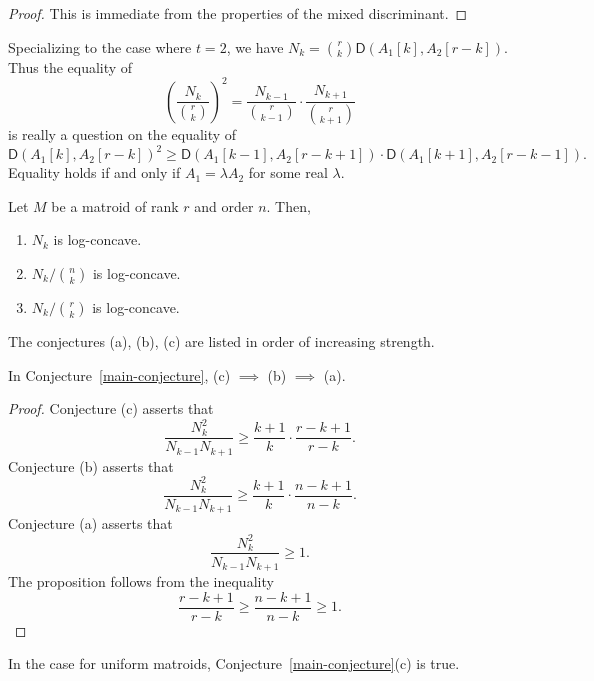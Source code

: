 \documentclass[12pt]{article}
\begin{document}
\begin{proof}
	This is immediate from the properties of the mixed discriminant. 
\end{proof}

Specializing to the case where $t = 2$, we have $N_k = \binom{r}{k} \mathsf{D} (A_1[k], A_2[r-k])$. Thus the equality of 
\[
	\left ( \frac{N_k}{\binom{r}{k}} \right )^2 = \frac{N_{k-1}}{\binom{r}{k-1}} \cdot \frac{N_{k+1}}{\binom{r}{k+1}}
\]
is really a question on the equality of 
\[
	\mathsf{D}(A_1[k], A_2[r-k])^2 \geq \mathsf{D}(A_1[k-1], A_2[r-k+1]) \cdot \mathsf{D}(A_1[k+1], A_2[r-k-1]). 
\]
Equality holds if and only if $A_1 = \lambda A_2$ for some real $\lambda$. 


\begin{conj} \label{main-conjecture}
	Let $M$ be a matroid of rank $r$ and order $n$. Then,  
	\begin{enumerate}[label = (\alph*)]
		\item $N_k$ is log-concave.
		\item $N_k /\binom{n}{k}$ is log-concave.
		\item $N_k / \binom{r}{k}$ is log-concave.
	\end{enumerate}
\end{conj}

The conjectures (a), (b), (c) are listed in order of increasing strength. 

\begin{prop}
	In Conjecture~\ref{main-conjecture}, (c) $\implies$ (b) $\implies$ (a). 
\end{prop}

\begin{proof}
	Conjecture (c) asserts that 
	\[
		\frac{N_k^2}{N_{k-1}N_{k+1}} \geq \frac{k+1}{k} \cdot \frac{r-k+1}{r-k}.
	\]
	Conjecture (b) asserts that
	\[
		\frac{N_k^2}{N_{k-1}N_{k+1}} \geq \frac{k+1}{k} \cdot \frac{n-k+1}{n-k}.
	\]
	Conjecture (a) asserts that 
	\[
		\frac{N_k^2}{N_{k-1}N_{k+1}} \geq 1. 
	\]
	The proposition follows from the inequality 
	\[
		\frac{r-k+1}{r-k} \geq \frac{n-k+1}{n-k} \geq 1.
	\]
\end{proof}

\begin{prop}
	In the case for uniform matroids, Conjecture~\ref{main-conjecture}(c) is true. 
\end{prop}
\end{document}
